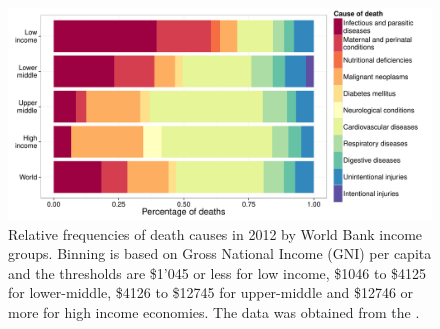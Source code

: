 \begin{knitrout}
\color{fgcolor}\begin{figure}
\includegraphics[width=\maxwidth]{figures/R/who-deaths/topCauses-who-deaths_top-causes-1} \caption[Relative frequencies of death causes in 2012 by World Bank income groups]{Relative frequencies of death causes in 2012 by World Bank income groups. Binning is based on Gross National Income (GNI) per capita and the thresholds are \$1'045 or less for low income, \$1046 to \$4125 for lower-middle, \$4126 to \$12745 for upper-middle and \$12746 or more for high income economies. The data was obtained from the \cite{WHO2012}.}\label{fig:who-deaths_top-causes}
\end{figure}


\end{knitrout}

\newcommand{\knitrTotalDeathsTwelve}{58.3 million}

\newcommand{\knitrPercentageDeathsTwelveHigh}{20.1\%}
\newcommand{\knitrPercentageDeathsTwelveLow}{14\%}
\newcommand{\knitrPercentageDeathsTwelveLmid}{36.5\%}
\newcommand{\knitrPercentageDeathsTwelveUmid}{29.4\%}

\newcommand{\knitrPercentDeathsTwelveLowInfect}{39.6\%}
\newcommand{\knitrPercentDeathsTwelveLowPerinat}{20.8\%}
\newcommand{\knitrPercentDeathsTwelveLmidInfect}{23.3\%}
\newcommand{\knitrPercentDeathsTwelveLmidCardio}{26.5\%}
\newcommand{\knitrPercentDeathsTwelveUmidInfect}{8.5\%}
\newcommand{\knitrPercentDeathsTwelveHighInfect}{6.7\%}
\newcommand{\knitrPercentDeathsTwelveWorldInfect}{18.3\%}
\newcommand{\knitrPercentDeathsTwelveWorldCardio}{33.7\%}
